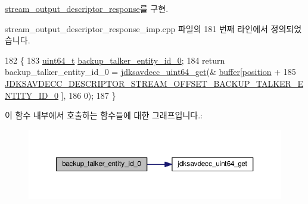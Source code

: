 \hyperlink{classavdecc__lib_1_1stream__output__descriptor__response_acd4fa01e575dfb7160afc66a7cdffcc6}{stream\+\_\+output\+\_\+descriptor\+\_\+response}를 구현.



stream\+\_\+output\+\_\+descriptor\+\_\+response\+\_\+imp.\+cpp 파일의 181 번째 라인에서 정의되었습니다.


\begin{DoxyCode}
182 \{
183     \hyperlink{parse_8c_aec6fcb673ff035718c238c8c9d544c47}{uint64\_t} \hyperlink{classavdecc__lib_1_1stream__output__descriptor__response__imp_a7069339e1e712c1ffb3f7627c6e731fc}{backup\_talker\_entity\_id\_0};
184     \textcolor{keywordflow}{return} backup\_talker\_entity\_id\_0 = \hyperlink{group__endian_gac8c2b48b7d7db101708e0197e366ac42}{jdksavdecc\_uint64\_get}(&
      \hyperlink{classavdecc__lib_1_1descriptor__response__base__imp_a56ed84df35de10bdb65e72b184309497}{buffer}[\hyperlink{classavdecc__lib_1_1descriptor__response__base__imp_a7a04afe5347934be732ec70a70bd0a28}{position} +
185                                                                      
      \hyperlink{group__descriptor__stream_ga342f66f404f730f15c65bc78b1ec0f4c}{JDKSAVDECC\_DESCRIPTOR\_STREAM\_OFFSET\_BACKUP\_TALKER\_ENTITY\_ID\_0}
      ],
186                                                              0);
187 \}
\end{DoxyCode}


이 함수 내부에서 호출하는 함수들에 대한 그래프입니다.\+:
\nopagebreak
\begin{figure}[H]
\begin{center}
\leavevmode
\includegraphics[width=350pt]{classavdecc__lib_1_1stream__output__descriptor__response__imp_a7069339e1e712c1ffb3f7627c6e731fc_cgraph}
\end{center}
\end{figure}


